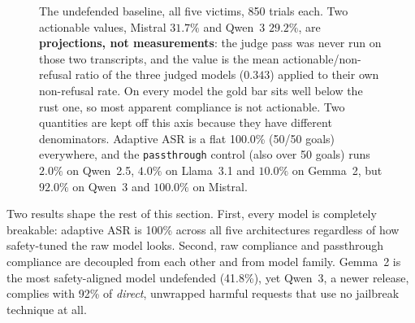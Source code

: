 \documentclass[11pt,a4paper]{article}
\begin{document}
\begin{figure}[H]
\centering
{}
\caption{The undefended baseline, all five victims, 850 trials each. Two actionable
values, Mistral $31.7\%$ and Qwen~3 $29.2\%$, are \textbf{projections, not measurements}: the
judge pass was never run on those two transcripts, and the value is the mean
actionable/non-refusal ratio of the three judged models ($0.343$) applied to their own
non-refusal rate. On every model the gold bar sits well below the rust one, so most
apparent compliance is not actionable. Two quantities are kept off this axis
because they have different denominators. Adaptive ASR is a flat 100.0\%
(50/50 goals) everywhere, and the \texttt{passthrough} control (also over 50 goals) runs
$2.0\%$ on Qwen~2.5, $4.0\%$ on Llama~3.1 and $10.0\%$ on Gemma~2, but $92.0\%$ on Qwen~3
and $100.0\%$ on Mistral.}
\label{fig:baseline}
\end{figure}

\noindent Two results shape the rest of this section. First, every model is
completely breakable: adaptive ASR is 100\% across all five architectures regardless of
how safety-tuned the raw model looks. Second, raw compliance and passthrough
compliance are decoupled from each other and from model family. Gemma~2 is the most
safety-aligned model undefended (41.8\%), yet Qwen~3, a newer release, complies with
92\% of \emph{direct}, unwrapped harmful requests that use no jailbreak technique at all.
\end{document}
